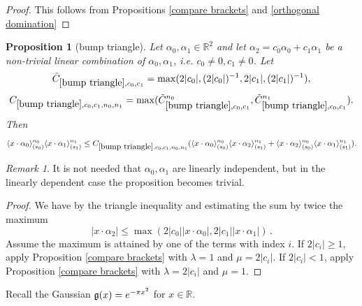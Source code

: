 \documentclass[12pt,reqno]{amsart}
\theoremstyle{plain}
\newtheorem{proposition}[theorem]{Proposition}
\numberwithin{equation}{section}
\theoremstyle{remark}
\newtheorem{rem}{Remark}[section]
\newcommand{\uses}[1]{}
\newcommand{\usesdefs}[1]{}
\newcommand{\R}{{\mathbb R}}
\begin{document}
\begin{proof}
This follows from Propositions \ref{compare brackets} and \ref{orthogonal domination}
\end{proof}

\begin{proposition}[bump triangle]\label{bump triangle}\uses{compare brackets}\usesdefs{bracket bump}
Let $\alpha_0,\alpha_1\in\mathbb{R}^2$ and let $\alpha_2=c_0\alpha_0+c_1\alpha_1$ be a non-trivial linear combination of $\alpha_0,\alpha_1$, i.e. $c_0\not=0, c_1\not=0$.
Let
\begin{equation}\label{auto:bump-triangle-scale-constant}\tilde{C}_{\ref{bump triangle},c_0,c_1}=\max(2|c_0|, (2|c_0|)^{-1},2|c_1|, (2|c_1|)^{-1}),\end{equation}
\begin{equation}\label{auto:bump-triangle-constant}
    C_{\ref{bump triangle},c_0,c_1,n_0,n_1}=\max(\tilde{C}_{\ref{bump triangle},c_0,c_1}^{n_0}, \tilde{C}_{\ref{bump triangle},c_0,c_1}^{n_1}).
\end{equation}
Then
\begin{equation}\label{auto:bump-triangle-bound} \langle x\cdot \alpha_0\rangle_{(s_0)}^{n_0} \langle x\cdot \alpha_1\rangle_{(s_1)}^{n_1}
\le C_{\ref{bump triangle},c_0,c_1,n_0,n_1}(\langle x\cdot \alpha_0\rangle_{(s_0)}^{n_0}\langle x\cdot \alpha_2\rangle_{(s_1)}^{n_1} + \langle x\cdot \alpha_2\rangle_{(s_0)}^{n_0}\langle x\cdot \alpha_1\rangle_{(s_1)}^{n_1}).
\end{equation}
\end{proposition}
\begin{rem}
It is not needed that $\alpha_0,\alpha_1$ are linearly independent, but in the linearly dependent case the proposition becomes trivial.
\end{rem}
\begin{proof}
We have by the triangle inequality and estimating the sum by twice the maximum
\begin{equation}
    |x\cdot \alpha_2|\le \max(2|c_0||x\cdot \alpha_0|,2|c_1||x\cdot \alpha_1|)\, .
\end{equation}
Assume the maximum is attained by one of the terms with index $i$.
If $2|c_i|\ge 1$, apply Proposition \ref{compare brackets} with $\lambda=1$ and $\mu=2|c_i|$.
If $2|c_i|< 1$, apply Proposition \ref{compare brackets} with $\lambda=2|c_i|$ and $\mu=1$.
\end{proof}


Recall the Gaussian $\mathfrak{g}(x)=e^{-\pi x^2}$ for $x\in\R$.
\end{document}
